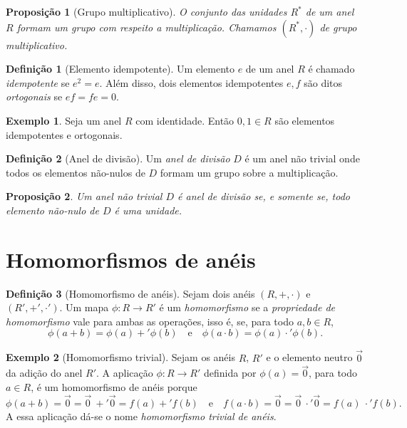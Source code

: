 \documentclass[a4paper,12pt]{report}
\theoremstyle{plain}
\newtheorem{proposicao}{Proposição}[section]
\theoremstyle{definition}
\newtheorem{definicao}{Definição}[section]
\newtheorem{exemplo}{Exemplo}[section]
\begin{document}
\begin{proposicao}[Grupo multiplicativo]
	O conjunto das unidades $R^*$ de um anel $R$ formam um grupo com respeito a multiplicação. Chamamos $(R^*,\cdot)$ de \emph{grupo multiplicativo}.
\end{proposicao}

\begin{definicao}[Elemento idempotente]
	Um elemento $e$ de um anel $R$ é chamado \emph{idempotente} se $e^2 = e$. Além disso, dois elementos idempotentes $e,f$ são ditos \emph{ortogonais} se $ef = fe = 0$.
\end{definicao}

\begin{exemplo}
	Seja um anel $R$ com identidade. Então $0,1 \in R$ são elementos idempotentes e ortogonais.
\end{exemplo}

\begin{definicao}[Anel de divisão]
	Um \emph{anel de divisão} $D$ é um anel não trivial onde todos os elementos não-nulos de $D$ formam um grupo sobre a multiplicação. 
\end{definicao}

\begin{proposicao}
	Um anel não trivial $D$ é anel de divisão se, e somente se, todo elemento não-nulo de $D$ é uma unidade.	
\end{proposicao}

\section{Homomorfismos de anéis}

\begin{definicao}[Homomorfismo de anéis]
	Sejam dois anéis $(R, +, \cdot)$ e $(R', +', \cdot')$. Um mapa $\phi: R \longrightarrow R'$ é um \emph{homomorfismo} se a \emph{propriedade de homomorfismo} vale para ambas as operações, isso é, se, para todo $a,b\in R$,
	$$\phi(a+b) = \phi(a) +' \phi(b) \quad \text{e} \quad \phi(a\cdot b) = \phi(a) \cdot' \phi(b).$$
\end{definicao}

\begin{exemplo}[Homomorfismo trivial]
	Sejam os anéis $R$, $R'$ e o elemento neutro $\vec 0$ da adição do anel $R'$. A aplicação $\phi: R\longrightarrow R'$ definida por $\phi(a) = \vec 0$, para todo $a\in R$, é um homomorfismo de anéis porque $$\phi(a + b) = \vec 0 = \vec 0 \ +' \vec 0 = f(a) +' f(b) \quad \text{e} \quad f(a\cdot b) = \vec 0 = \vec 0 \ \cdot' \vec 0 = f(a)\ \cdot' f(b).$$
	A essa aplicação dá-se o nome \emph{homomorfismo trivial de anéis}.
\end{exemplo}
\end{document}
